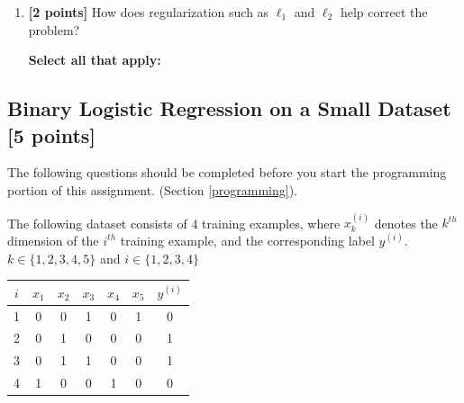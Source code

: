 \documentclass[11pt]{article}
\numberwithin{equation}{section} %
\numberwithin{figure}{section} %
\numberwithin{table}{section} %
\begin{document}
\begin{enumerate}[label=(\alph*)]
     \begin{solution}
    \bigskip \bigskip \bigskip \bigskip \bigskip \bigskip \bigskip \bigskip
    \end{solution}
    
    \clearpage
         
    \item {\bf [2 points]} How does regularization such as $\ell_1$ and $\ell_2$ help correct the problem?
    
    \textbf{Select all that apply:}

    
    \clearpage
   
    
\end{enumerate}
 \subsection{Binary Logistic Regression on a Small Dataset [5 points]}
 \label{sec:warm-up}
 The following questions should be completed before you start the programming portion of this assignment. (Section \ref{programming}).
 
 The following dataset consists of 4 training examples, where $x_k^{(i)}$ denotes the $k^{th}$ dimension of the $i^{th}$ training example, and the corresponding label $y^{(i)}$. $k \in \{1, 2, 3, 4, 5\}$ and $i \in \{1, 2, 3, 4\}$

\begin{center}
\begin{tabular}{|c|c|c|c|c|c|c|}
\hline
$i$ & $x_{1}$ & $x_{2}$ & $x_{3}$ & $x_{4}$ & $x_{5}$ & $y^{(i)}$ \\ \hline
1 & 0 & 0 & 1 & 0 & 1 & 0   \\ \hline
2 & 0 & 1 & 0 & 0 & 0 & 1     \\ \hline
3 & 0 & 1 & 1 & 0 & 0 & 1    \\ \hline
4 & 1 & 0 & 0 & 1 & 0 & 0   \\ \hline

\end{tabular}
\end{center}
\end{document}
